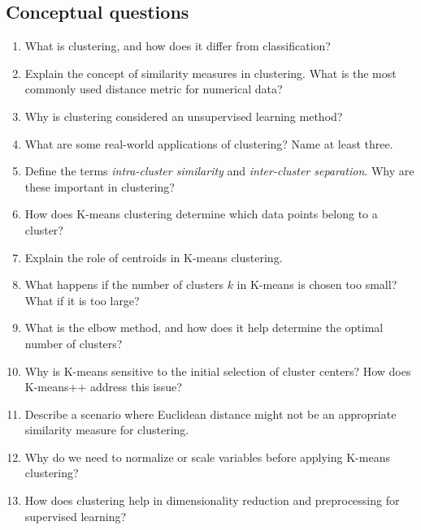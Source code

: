 \documentclass[
  11pt,
]{book}
\providecommand{\tightlist}{%
  \setlength{\itemsep}{0pt}\setlength{\parskip}{0pt}}
\theoremstyle{definition}
\theoremstyle{definition}
\theoremstyle{definition}
\theoremstyle{definition}
\theoremstyle{remark}
\begin{document}
\subsection*{Conceptual questions}\label{conceptual-questions-11}


\begin{enumerate}
\def\labelenumi{\arabic{enumi}.}
\tightlist
\item
  What is clustering, and how does it differ from classification?\\
\item
  Explain the concept of similarity measures in clustering. What is the most commonly used distance metric for numerical data?\\
\item
  Why is clustering considered an unsupervised learning method?\\
\item
  What are some real-world applications of clustering? Name at least three.\\
\item
  Define the terms \emph{intra-cluster similarity} and \emph{inter-cluster separation}. Why are these important in clustering?\\
\item
  How does K-means clustering determine which data points belong to a cluster?\\
\item
  Explain the role of centroids in K-means clustering.\\
\item
  What happens if the number of clusters \(k\) in K-means is chosen too small? What if it is too large?\\
\item
  What is the elbow method, and how does it help determine the optimal number of clusters?\\
\item
  Why is K-means sensitive to the initial selection of cluster centers? How does K-means++ address this issue?\\
\item
  Describe a scenario where Euclidean distance might not be an appropriate similarity measure for clustering.\\
\item
  Why do we need to normalize or scale variables before applying K-means clustering?\\
\item
  How does clustering help in dimensionality reduction and preprocessing for supervised learning?\\

\end{enumerate}
\end{document}

